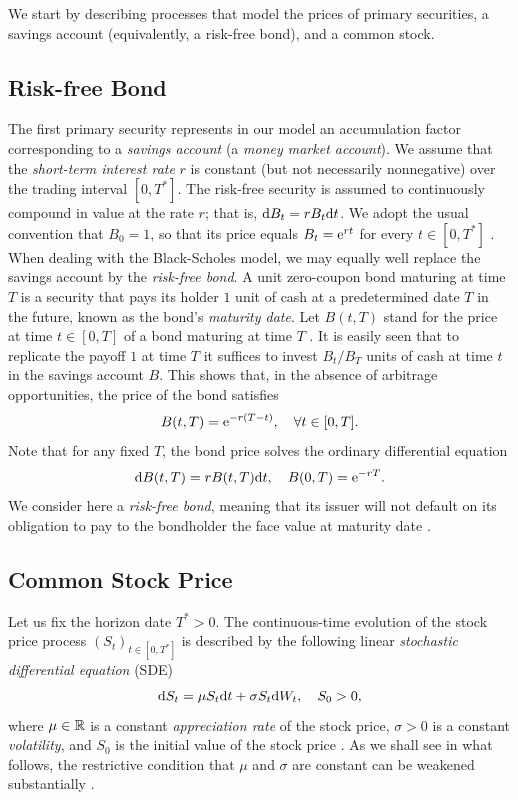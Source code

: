 We start by describing processes that model the prices of primary securities, a savings account (equivalently, a risk-free bond), and a common stock.

\subsection{Risk-free Bond}
The first primary security represents in our model an accumulation factor corresponding to a \emph{savings account} (a \emph{money market account}). We assume that the \emph{short-term interest rate} \(r\) is constant (but not necessarily nonnegative) over the trading interval \([0, T^*]\). The risk-free security is assumed to continuously compound in value at the rate \(r\); that is, \(\mathrm{d} B_t = r B_t \mathrm{d} t\). We adopt the usual convention that \(B_0 = 1\), so that its price equals \(B_t = \mathrm{e}^{rt}\) for every \(t \in [0, T^*]\) \citep{merton_theory_1973}. When dealing with the Black-Scholes model, we may equally well replace the savings account by the \emph{risk-free bond}. A unit zero-coupon bond maturing at time \(T\) is a security that pays its holder \(1\) unit of cash at a predetermined date \(T\) in the future, known as the bond's \emph{maturity date}. Let \(B(t, T)\) stand for the price at time \(t \in [0, T]\) of a bond maturing at time \(T\) \citep{brennan_continuous_1979}. It is easily seen that to replicate the payoff \(1\) at time \(T\) it suffices to invest \(B_t/B_T\) units of cash at time \(t\) in the savings account \(B\). This shows that, in the absence of arbitrage opportunities, the price of the bond satisfies
\begin{equation} \label{eq:BondPriceNoArbitrage}
	B(t, T) = \mathrm{e}^{-r(T-t)}, \quad \forall t \in [0, T].
\end{equation}
Note that for any fixed \(T\), the bond price solves the ordinary differential equation
\begin{equation} \label{eq:BondODE}
	\mathrm{d} B(t, T) = r B(t, T) \mathrm{d} t, \quad B(0, T) = \mathrm{e}^{-rT}.
\end{equation}
We consider here a \emph{risk-free bond}, meaning that its issuer will not default on its obligation to pay to the bondholder the face value at maturity date \citep{bielecki_hedging_2004}.

\subsection{Common Stock Price}
Let us fix the horizon date \(T^* > 0\). The continuous-time evolution of the stock price process \((S_t)_{t\in[0,T^*]}\) is described by the following linear \emph{stochastic differential equation} (SDE)
\begin{equation} \label{eq:LinearSDE}
	\mathrm{d} S_t = \mu S_t \mathrm{d} t + \sigma S_t \mathrm{d} W_t, \quad S_0 > 0,
\end{equation}
where \(\mu \in \mathbb{R}\) is a constant \emph{appreciation rate} of the stock price, \(\sigma > 0\) is a constant \emph{volatility}, and \(S_0\) is the initial value of the stock price \citep{black_pricing_1973}. As we shall see in what follows, the restrictive condition that \(\mu\) and \(\sigma\) are constant can be weakened substantially \citep{heston_closed-form_1993, bensoussan_stochastic_1994}.

